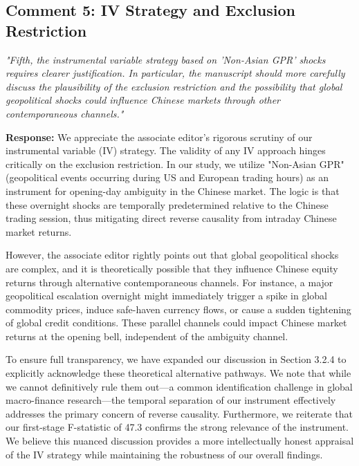 \documentclass[12pt]{article}
\begin{document}
\subsection*{Comment 5: IV Strategy and Exclusion Restriction}
\textit{"Fifth, the instrumental variable strategy based on 'Non-Asian GPR' shocks requires clearer justification. In particular, the manuscript should more carefully discuss the plausibility of the exclusion restriction and the possibility that global geopolitical shocks could influence Chinese markets through other contemporaneous channels."}

\begin{highlightbox}
\textbf{Response:} We appreciate the associate editor's rigorous scrutiny of our instrumental variable (IV) strategy. The validity of any IV approach hinges critically on the exclusion restriction. In our study, we utilize "Non-Asian GPR" (geopolitical events occurring during US and European trading hours) as an instrument for opening-day ambiguity in the Chinese market. The logic is that these overnight shocks are temporally predetermined relative to the Chinese trading session, thus mitigating direct reverse causality from intraday Chinese market returns.

However, the associate editor rightly points out that global geopolitical shocks are complex, and it is theoretically possible that they influence Chinese equity returns through alternative contemporaneous channels. For instance, a major geopolitical escalation overnight might immediately trigger a spike in global commodity prices, induce safe-haven currency flows, or cause a sudden tightening of global credit conditions. These parallel channels could impact Chinese market returns at the opening bell, independent of the ambiguity channel.

To ensure full transparency, we have expanded our discussion in Section 3.2.4 to explicitly acknowledge these theoretical alternative pathways. We note that while we cannot definitively rule them out—a common identification challenge in global macro-finance research—the temporal separation of our instrument effectively addresses the primary concern of reverse causality. Furthermore, we reiterate that our first-stage F-statistic of 47.3 confirms the strong relevance of the instrument. We believe this nuanced discussion provides a more intellectually honest appraisal of the IV strategy while maintaining the robustness of our overall findings.
\end{highlightbox}
\end{document}

